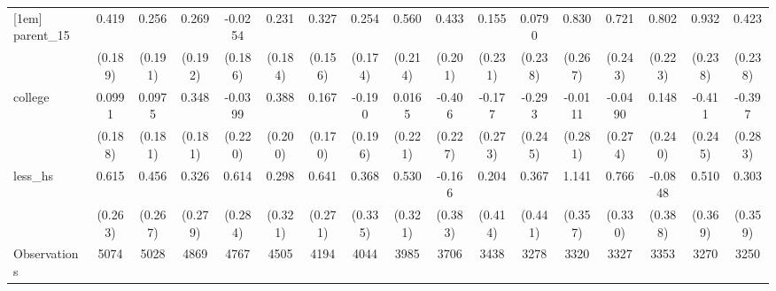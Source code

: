 {\begin{tabular}{l*{16}{c}}
[1em]
parent\_15           &       0.419\sym{*}  &       0.256         &       0.269         &     -0.0254         &       0.231         &       0.327\sym{*}  &       0.254         &       0.560\sym{**} &       0.433\sym{*}  &       0.155         &      0.0790         &       0.830\sym{**} &       0.721\sym{**} &       0.802\sym{***}&       0.932\sym{***}&       0.423         \\
                    &     (0.189)         &     (0.191)         &     (0.192)         &     (0.186)         &     (0.184)         &     (0.156)         &     (0.174)         &     (0.214)         &     (0.201)         &     (0.231)         &     (0.238)         &     (0.267)         &     (0.243)         &     (0.223)         &     (0.238)         &     (0.238)         \\
[1em]
college             &      0.0991         &      0.0975         &       0.348         &     -0.0399         &       0.388         &       0.167         &      -0.190         &      0.0165         &      -0.406         &      -0.177         &      -0.293         &     -0.0111         &     -0.0490         &       0.148         &      -0.411         &      -0.397         \\
                    &     (0.188)         &     (0.181)         &     (0.181)         &     (0.220)         &     (0.200)         &     (0.170)         &     (0.196)         &     (0.221)         &     (0.227)         &     (0.273)         &     (0.245)         &     (0.281)         &     (0.274)         &     (0.240)         &     (0.245)         &     (0.283)         \\
[1em]
less\_hs             &       0.615\sym{*}  &       0.456         &       0.326         &       0.614\sym{*}  &       0.298         &       0.641\sym{*}  &       0.368         &       0.530         &      -0.166         &       0.204         &       0.367         &       1.141\sym{**} &       0.766\sym{*}  &     -0.0848         &       0.510         &       0.303         \\
                    &     (0.263)         &     (0.267)         &     (0.279)         &     (0.284)         &     (0.321)         &     (0.271)         &     (0.335)         &     (0.321)         &     (0.383)         &     (0.414)         &     (0.441)         &     (0.357)         &     (0.330)         &     (0.388)         &     (0.369)         &     (0.359)         \\
\hline
Observations        &        5074         &        5028         &        4869         &        4767         &        4505         &        4194         &        4044         &        3985         &        3706         &        3438         &        3278         &        3320         &        3327         &        3353         &        3270         &        3250         \\

\end{tabular}}
